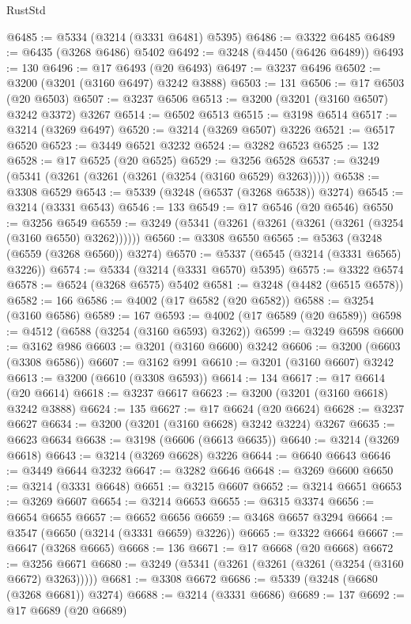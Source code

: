 \begin{lexlean}{RustStd}
\begin{coremodule}
@6485 := @5334 (@3214 (@3331 @6481) @5395)
@6486 := @3322 @6485
@6489 := @6435 (@3268 @6486) @5402
@6492 := @3248 (@4450 (@6426 @6489))
@6493 := 130
@6496 := @17 @6493 (@20 @6493)
@6497 := @3237 @6496
@6502 := @3200 (@3201 (@3160 @6497) @3242 @3888)
@6503 := 131
@6506 := @17 @6503 (@20 @6503)
@6507 := @3237 @6506
@6513 := @3200 (@3201 (@3160 @6507) @3242 @3372) @3267
@6514 := @6502 @6513
@6515 := @3198 @6514
@6517 := @3214 (@3269 @6497)
@6520 := @3214 (@3269 @6507) @3226
@6521 := @6517 @6520
@6523 := @3449 @6521 @3232
@6524 := @3282 @6523
@6525 := 132
@6528 := @17 @6525 (@20 @6525)
@6529 := @3256 @6528
@6537 := @3249 (@5341 (@3261 (@3261 (@3261 (@3254 (@3160 @6529) @3263)))))
@6538 := @3308 @6529
@6543 := @5339 (@3248 (@6537 (@3268 @6538)) @3274)
@6545 := @3214 (@3331 @6543)
@6546 := 133
@6549 := @17 @6546 (@20 @6546)
@6550 := @3256 @6549
@6559 := @3249 (@5341 (@3261 (@3261 (@3261 (@3261 (@3254 (@3160 @6550) @3262))))))
@6560 := @3308 @6550
@6565 := @5363 (@3248 (@6559 (@3268 @6560)) @3274)
@6570 := @5337 (@6545 (@3214 (@3331 @6565) @3226))
@6574 := @5334 (@3214 (@3331 @6570) @5395)
@6575 := @3322 @6574
@6578 := @6524 (@3268 @6575) @5402
@6581 := @3248 (@4482 (@6515 @6578))
@6582 := 166
@6586 := @4002 (@17 @6582 (@20 @6582))
@6588 := @3254 (@3160 @6586)
@6589 := 167
@6593 := @4002 (@17 @6589 (@20 @6589))
@6598 := @4512 (@6588 (@3254 (@3160 @6593) @3262))
@6599 := @3249 @6598
@6600 := @3162 @986
@6603 := @3201 (@3160 @6600) @3242
@6606 := @3200 (@6603 (@3308 @6586))
@6607 := @3162 @991
@6610 := @3201 (@3160 @6607) @3242
@6613 := @3200 (@6610 (@3308 @6593))
@6614 := 134
@6617 := @17 @6614 (@20 @6614)
@6618 := @3237 @6617
@6623 := @3200 (@3201 (@3160 @6618) @3242 @3888)
@6624 := 135
@6627 := @17 @6624 (@20 @6624)
@6628 := @3237 @6627
@6634 := @3200 (@3201 (@3160 @6628) @3242 @3224) @3267
@6635 := @6623 @6634
@6638 := @3198 (@6606 (@6613 @6635))
@6640 := @3214 (@3269 @6618)
@6643 := @3214 (@3269 @6628) @3226
@6644 := @6640 @6643
@6646 := @3449 @6644 @3232
@6647 := @3282 @6646
@6648 := @3269 @6600
@6650 := @3214 (@3331 @6648)
@6651 := @3215 @6607
@6652 := @3214 @6651
@6653 := @3269 @6607
@6654 := @3214 @6653
@6655 := @6315 @3374
@6656 := @6654 @6655
@6657 := @6652 @6656
@6659 := @3468 @6657 @3294
@6664 := @3547 (@6650 (@3214 (@3331 @6659) @3226))
@6665 := @3322 @6664
@6667 := @6647 (@3268 @6665)
@6668 := 136
@6671 := @17 @6668 (@20 @6668)
@6672 := @3256 @6671
@6680 := @3249 (@5341 (@3261 (@3261 (@3261 (@3254 (@3160 @6672) @3263)))))
@6681 := @3308 @6672
@6686 := @5339 (@3248 (@6680 (@3268 @6681)) @3274)
@6688 := @3214 (@3331 @6686)
@6689 := 137
@6692 := @17 @6689 (@20 @6689)

\end{coremodule}
\end{lexlean}
